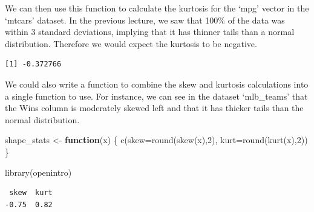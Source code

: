 \documentclass[
  letterpaper,
  DIV=11,
  numbers=noendperiod]{scrreprt}
\newenvironment{Shaded}{\begin{snugshade}}{\end{snugshade}}
\newcommand{\AttributeTok}[1]{\textcolor[rgb]{0.40,0.45,0.13}{#1}}
\newcommand{\ControlFlowTok}[1]{\textcolor[rgb]{0.00,0.23,0.31}{\textbf{#1}}}
\newcommand{\DecValTok}[1]{\textcolor[rgb]{0.68,0.00,0.00}{#1}}
\newcommand{\FunctionTok}[1]{\textcolor[rgb]{0.28,0.35,0.67}{#1}}
\newcommand{\NormalTok}[1]{\textcolor[rgb]{0.00,0.23,0.31}{#1}}
\newcommand{\OtherTok}[1]{\textcolor[rgb]{0.00,0.23,0.31}{#1}}
\newcommand{\SpecialCharTok}[1]{\textcolor[rgb]{0.37,0.37,0.37}{#1}}
\begin{document}
We can then use this function to calculate the kurtosis for the `mpg'
vector in the `mtcars' dataset. In the previous lecture, we saw that
100\% of the data was within 3 standard deviations, implying that it has
thinner tails than a normal distribution. Therefore we would expect the
kurtosis to be negative.

\begin{Shaded}
\end{Shaded}

\begin{verbatim}
[1] -0.372766
\end{verbatim}

We could also write a function to combine the skew and kurtosis
calculations into a single function to use. For instance, we can see in
the dataset `mlb\_teams' that the Wins column is moderately skewed left
and that it has thicker tails than the normal distribution.

\begin{Shaded}
\begin{Highlighting}[]
\NormalTok{shape\_stats }\OtherTok{\textless{}{-}} \ControlFlowTok{function}\NormalTok{(x) \{}
                    \FunctionTok{c}\NormalTok{(}\AttributeTok{skew=}\FunctionTok{round}\NormalTok{(}\FunctionTok{skew}\NormalTok{(x),}\DecValTok{2}\NormalTok{),}
                    \AttributeTok{kurt=}\FunctionTok{round}\NormalTok{(}\FunctionTok{kurt}\NormalTok{(x),}\DecValTok{2}\NormalTok{))}
\NormalTok{\}}
\end{Highlighting}
\end{Shaded}

\begin{Shaded}
\begin{Highlighting}[]
\FunctionTok{library}\NormalTok{(openintro)}
\end{Highlighting}
\end{Shaded}

\begin{Shaded}
\end{Shaded}

\begin{verbatim}
 skew  kurt 
-0.75  0.82 
\end{verbatim}
\end{document}
